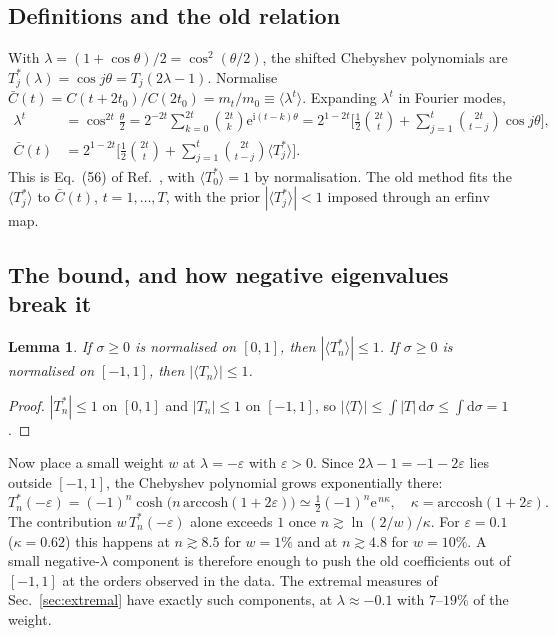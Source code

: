 \documentclass[11pt]{article}
\newcommand{\dd}{\mathrm{d}}
\newcommand{\ee}{\mathrm{e}}
\newcommand{\ii}{\mathrm{i}}
\newtheorem{lemma}{Lemma}
\theoremstyle{remark}
\begin{document}
\subsection{Definitions and the old relation}
With $\lambda=(1+\cos\theta)/2=\cos^2(\theta/2)$, the shifted Chebyshev polynomials are $T^*_j(\lambda)=\cos j\theta=T_j(2\lambda-1)$.
Normalise $\bar C(t)=C(t+2t_0)/C(2t_0)=m_t/m_0\equiv\langle\lambda^t\rangle$. Expanding $\lambda^t$ in Fourier modes,
\begin{align}
 \lambda^t&=\cos^{2t}\!\tfrac\theta2=2^{-2t}\!\!\sum_{k=0}^{2t}\binom{2t}{k}\ee^{\ii(t-k)\theta}
 =2^{1-2t}\Big[\tfrac12\binom{2t}{t}+\sum_{j=1}^{t}\binom{2t}{t-j}\cos j\theta\Big],\\
 \bar C(t)&=2^{1-2t}\Big[\tfrac12\binom{2t}{t}+\sum_{j=1}^{t}\binom{2t}{t-j}\langle T^*_j\rangle\Big].\label{eq:cbar}
\end{align}
This is Eq.~(56) of Ref.~\cite{Chen:TauNote}, with $\langle T^*_0\rangle=1$ by normalisation. The old method fits the $\langle T^*_j\rangle$ to $\bar C(t)$, $t=1,\dots,T$,
with the prior $|\langle T^*_j\rangle|<1$ imposed through an $\mathrm{erfinv}$ map.

\subsection{The bound, and how negative eigenvalues break it}
\begin{lemma}
If $\sigma\ge0$ is normalised on $[0,1]$, then $|\langle T^*_n\rangle|\le1$. If $\sigma\ge0$ is normalised on $[-1,1]$, then $|\langle T_n\rangle|\le1$.
\end{lemma}
\begin{proof}
$|T^*_n|\le1$ on $[0,1]$ and $|T_n|\le1$ on $[-1,1]$, so $|\langle T\rangle|\le\int|T|\,\dd\sigma\le\int\dd\sigma=1$.
\end{proof}
Now place a small weight $w$ at $\lambda=-\varepsilon$ with $\varepsilon>0$. Since $2\lambda-1=-1-2\varepsilon$ lies outside $[-1,1]$, the Chebyshev polynomial grows exponentially there:
\begin{equation}
 T^*_n(-\varepsilon)=(-1)^n\cosh\!\big(n\,\mathrm{arccosh}(1+2\varepsilon)\big)\simeq\tfrac12(-1)^n\ee^{\,n\kappa},\quad \kappa=\mathrm{arccosh}(1+2\varepsilon).
\end{equation}
The contribution $w\,T^*_n(-\varepsilon)$ alone exceeds $1$ once $n\gtrsim\ln(2/w)/\kappa$. For $\varepsilon=0.1$ ($\kappa=0.62$) this happens at
$n\gtrsim8.5$ for $w=1\%$ and at $n\gtrsim4.8$ for $w=10\%$. A small negative-$\lambda$ component is therefore enough to push the old
coefficients out of $[-1,1]$ at the orders observed in the data. The extremal measures of Sec.~\ref{sec:extremal} have exactly such components, at $\lambda\approx-0.1$ with $7$--$19\%$ of the weight.
\end{document}
